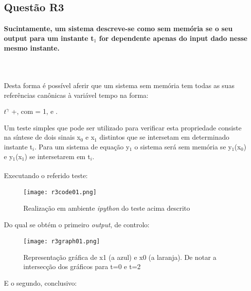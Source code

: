 \documentclass[a4paper,12pt]{article}
\begin{document}
		\subsection{Questão R3}
			\paragraph{Sucintamente, um sistema descreve-se como sem memória se o seu output para um instante t$_1$ for dependente apenas do input dado nesse mesmo instante.}
			\mbox{}\\
			\mbox{}\\
			Desta forma é possível aferir que um sistema sem memória tem todas as suas referências canônicas à variável tempo na forma:
			\\ 
			\begin{center}
				\textalpha $t^{\gamma}$ +\textbeta , com \textalpha = 1,  e .
			\end{center}
			Um teste simples que pode ser utilizado para verificar esta propriedade consiste na síntese de dois sinais x$_0$ e x$_1$ distintos que se intersetam em determinado instante t$_i$. Para um sistema de equação y$_1$ o sistema será sem memória se y$_1$(x$_0$) e y$_1$(x$_1$) se intersetarem em t$_i$.
			\mbox{}\\
			\mbox{}\\
			Executando o referido teste:
			\begin{figure}[H]
      				\centering
      				\captionsetup{justification=centering}
      				\texttt{[image: r3code01.png]}
				\caption{Realização em ambiente \textit{ipython} do teste acima descrito}
      			\end{figure}
			Do qual se obtém o primeiro \textit{output}, de controlo:
			\begin{figure}[H]
        			\centering
        			\captionsetup{justification=centering}
        			\texttt{[image: r3graph01.png]}
				\caption{Representação gráfica de x1 (a azul) e x0 (a laranja). De notar a intersecção dos gráficos para t=0 e t=2}
        		\end{figure}
			E o segundo, conclusivo:
\end{document}
